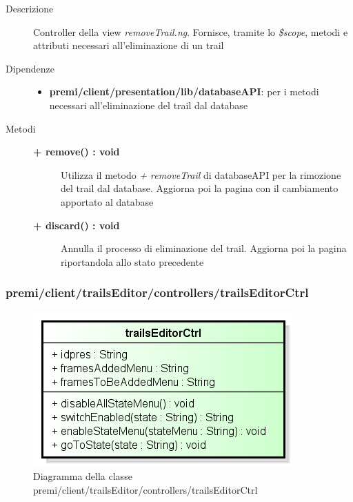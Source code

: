 \begin{description}
\item[Descrizione] \hfill
	Controller della view \textit{removeTrail.ng}. Fornisce, tramite lo \textit{\$scope}, metodi e attributi necessari all'eliminazione di un trail
	
	
\item[Dipendenze] \hfill
	\begin{itemize}
		\item \textbf{premi/client/presentation/lib/databaseAPI}: per i metodi necessari all'eliminazione del trail dal database
	\end{itemize}
	
	
\item[Metodi] \hfill

	\begin{description}
		\item[\textbf{\color{blue}+ remove() : void			}] \hfill
			Utilizza il metodo \textit{+ removeTrail} di databaseAPI per la rimozione del trail dal database. Aggiorna poi la pagina con il cambiamento apportato al database
	\end{description}
	
	\begin{description}
		\item[\textbf{\color{blue}+ discard() : void			}] \hfill
			Annulla il processo di eliminazione del trail. Aggiorna poi la pagina riportandola allo stato precedente
	\end{description}

\end{description}
	







\subsubsection{premi/client/trailsEditor/controllers/trailsEditorCtrl}
\begin{figure}[h]
\begin{center}
\includegraphics[scale=0.55]{img/diacla/trailsEditorCtrl.png}
\caption{Diagramma della classe premi/client/trailsEditor/controllers/trailsEditorCtrl}
\end{center}
\end{figure}


